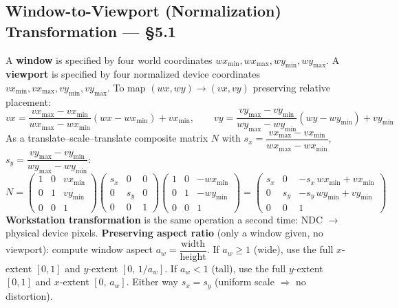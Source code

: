 \documentclass[12pt, a4paper]{article}
\newenvironment{answerbox}{\begin{mdframed}[style=answerframe]}{\end{mdframed}}
\begin{document}
\subsection{Window-to-Viewport (Normalization) Transformation --- \S5.1}
\begin{answerbox}
A \textbf{window} is specified by four world coordinates $wx_{\min}, wx_{\max}, wy_{\min}, wy_{\max}$. A \textbf{viewport} is specified by four normalized device coordinates $vx_{\min}, vx_{\max}, vy_{\min}, vy_{\max}$. To map $(wx,wy)\to(vx,vy)$ preserving relative placement:
$$vx = \frac{vx_{\max}-vx_{\min}}{wx_{\max}-wx_{\min}}(wx-wx_{\min})+vx_{\min}, \qquad vy = \frac{vy_{\max}-vy_{\min}}{wy_{\max}-wy_{\min}}(wy-wy_{\min})+vy_{\min}$$
As a translate--scale--translate composite matrix $N$ with $s_x=\dfrac{vx_{\max}-vx_{\min}}{wx_{\max}-wx_{\min}}$, $s_y=\dfrac{vy_{\max}-vy_{\min}}{wy_{\max}-wy_{\min}}$:
$$N = \begin{pmatrix}1&0&vx_{\min}\\0&1&vy_{\min}\\0&0&1\end{pmatrix}\begin{pmatrix}s_x&0&0\\0&s_y&0\\0&0&1\end{pmatrix}\begin{pmatrix}1&0&-wx_{\min}\\0&1&-wy_{\min}\\0&0&1\end{pmatrix} = \begin{pmatrix}s_x&0&-s_x\,wx_{\min}+vx_{\min}\\0&s_y&-s_y\,wy_{\min}+vy_{\min}\\0&0&1\end{pmatrix}$$
\textbf{Workstation transformation} is the same operation a second time: NDC $\to$ physical device pixels.
\textbf{Preserving aspect ratio} (only a window given, no viewport): compute window aspect $a_w=\dfrac{\text{width}}{\text{height}}$. If $a_w\ge1$ (wide), use the full $x$-extent $[0,1]$ and $y$-extent $[0,\,1/a_w]$. If $a_w<1$ (tall), use the full $y$-extent $[0,1]$ and $x$-extent $[0,\,a_w]$. Either way $s_x=s_y$ (uniform scale $\Rightarrow$ no distortion).
\end{answerbox}

\end{document}
